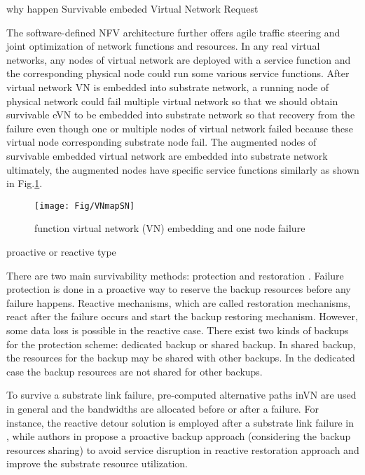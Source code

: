 why happen Survivable embeded Virtual Network Request

The software-defined NFV architecture further offers agile traffic steering and joint optimization of network functions and resources.
In any real virtual networks, any nodes of virtual network  are deployed with a service function and the corresponding physical node could run some various service functions. After virtual network VN is embedded into substrate network, a running node of physical network could fail multiple virtual network so that we should obtain survivable eVN to be embedded into substrate network so that recovery from the failure even though one or multiple nodes of virtual network failed because these virtual node corresponding substrate node fail. The augmented nodes of survivable embedded virtual network are embedded into substrate network ultimately, the augmented nodes have specific service functions similarly as shown in Fig.\ref{fig:VNmapSN}.

\begin{figure}
  \centering
  \texttt{[image: Fig/VNmapSN]}\\
  \caption{function virtual network (VN) embedding and one node failure}\label{fig:VNmapSN}
\end{figure}

proactive or reactive type

There are two main survivability methods: protection and restoration \cite{ramamurthy2003survivable}. Failure protection is done in a proactive way to reserve the backup resources before any failure happens. Reactive mechanisms, which are called restoration mechanisms, react after the failure occurs and start the backup restoring mechanism. However, some data loss is possible in the reactive case. There exist two kinds of backups for the protection scheme: dedicated backup or shared backup. In shared backup, the resources for the backup may be shared with other backups. In the dedicated case the backup resources are not shared for other backups.


To survive a substrate link failure, pre-computed alternative paths inVN are used in general and the bandwidths are allocated before or after a failure. For instance, the reactive detour solution is employed after a substrate link failure in \cite{rahman2010survivable}, while authors in \cite{rahman2013svne,guo2011shared} propose a proactive backup approach (considering the backup resources sharing) to avoid service disruption in reactive restoration approach and improve the substrate resource utilization.


